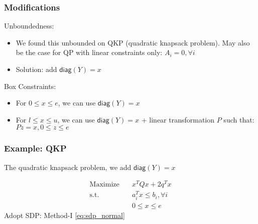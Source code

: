 \begin{frame}
  \frametitle{Modifications}
  Unboundedness:
  \begin{itemize}
    \item We found this unbounded on QKP (quadratic knapsack problem).
          May also be the case for QP with linear constraints only: \(A_i = 0, \forall i\)
    \item Solution: add \(\mathsf{diag}(Y) = x\)
  \end{itemize}

  Box Constraints:

  \begin{itemize}
    \item For \(0 \le x \le e\), we can use \(\mathsf{diag}(Y) = x\)
    \item For \(l \le x \le u\), we can use \(\mathsf{diag}(Y) = x\)
          + linear transformation \(P\) such that: \(Pz = x, 0\le z \le e\)
  \end{itemize}

\end{frame}

\begin{frame}
  \frametitle{Example: QKP}
  The quadratic knapsack problem, we add \(\mathsf{diag}(Y) = x\)

  \begin{equation}
    \begin{aligned}
      \mathrm{Maximize}\quad & x^TQx   + 2q^T x           \\
      \mathrm{s.t.}  \quad   & a_i^Tx \le  b_i, \forall i \\
                             & 0\le x\le e
    \end{aligned}
  \end{equation}
  Adopt SDP: Method-I \eqref{eq:sdp_normal}

\end{frame}

